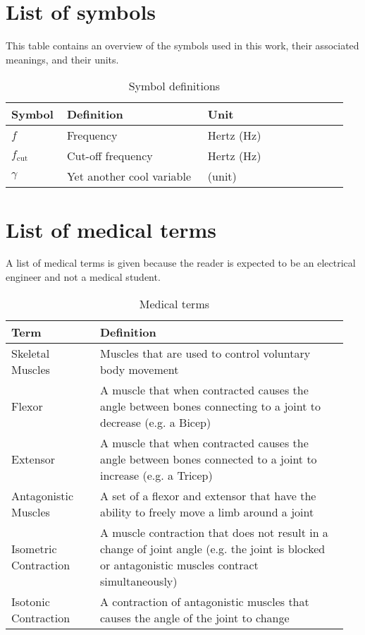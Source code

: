 \section{List of symbols}
This table contains an overview of the symbols used in this work, their associated meanings, and their units.

\begin{table}[H]
    \centering
    \begin{tabular}{p{0.15\linewidth} | p{0.4\linewidth} | p{0.4\linewidth}}
    Symbol & Definition & Unit \\ \hline
    $f$ & Frequency & Hertz (Hz) \\ 
    $f_\text{cut}$ & Cut-off frequency & Hertz (Hz) \\
    $\gamma$ & Yet another cool variable & (unit)
    \end{tabular}
    \caption{Symbol definitions}
    \label{tab:symbol_definitions}
\end{table}

\section{List of medical terms}
A list of medical terms is given because the reader is expected to be an electrical engineer and not a medical student.
\begin{table}[H]
    \centering
    \begin{tabular}{p{0.25\linewidth} | p{0.7\linewidth}}
    Term & Definition \\ \hline
    Skeletal Muscles & Muscles that are used to control voluntary body movement \\
    Flexor & A muscle that when contracted causes the angle between bones connecting to a joint to decrease (e.g. a Bicep) \\
    Extensor & A muscle that when contracted causes the angle between bones connected to a joint to increase (e.g. a Tricep) \\
    Antagonistic Muscles & A set of a flexor and extensor that have the ability to freely move a limb around a joint \\ 
    Isometric Contraction & A muscle contraction that does not result in a change of joint angle (e.g. the joint is blocked or antagonistic muscles contract simultaneously)\\
    Isotonic Contraction & A contraction of antagonistic muscles that causes the angle of the joint to change \\
    \end{tabular}
    \caption{Medical terms}
    \label{tab:medical_definitions}
\end{table}